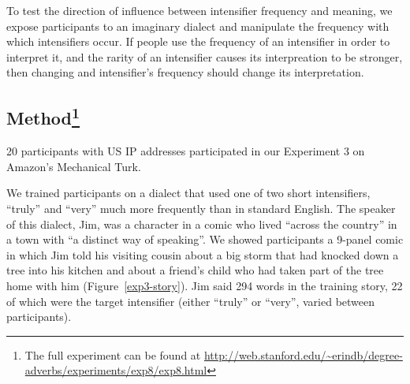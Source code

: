 \documentclass[10pt,letterpaper]{article}
\begin{document}
To test the direction of influence between intensifier frequency and meaning, we expose participants to an imaginary dialect and manipulate the frequency with which intensifiers occur.
If people use the frequency of an intensifier in order to interpret it, and the rarity of an intensifier causes its interpreation to be stronger, then changing and intensifier's frequency should change its interpretation. 

\subsection{Method\footnote{The full experiment can be found at \url{http://web.stanford.edu/~erindb/degree-adverbs/experiments/exp8/exp8.html}}}


20 participants with US IP addresses participated in our Experiment 3 on Amazon's Mechanical Turk.

We trained participants on a dialect that used one of two short intensifiers, ``truly'' and ``very'' much more frequently than in standard English.
The speaker of this dialect, Jim, was a character in a comic who lived ``across the country'' in a town with ``a distinct way of speaking''.
We showed participants a 9-panel comic in which Jim told his visiting cousin about a big storm that had knocked down a tree into his kitchen and about a friend's child who had taken part of the tree home with him (Figure~\ref{exp3-story}).
Jim said 294 words in the training story, 22 of which were the target intensifier (either ``truly'' or ``very'', varied between participants).
\end{document}
